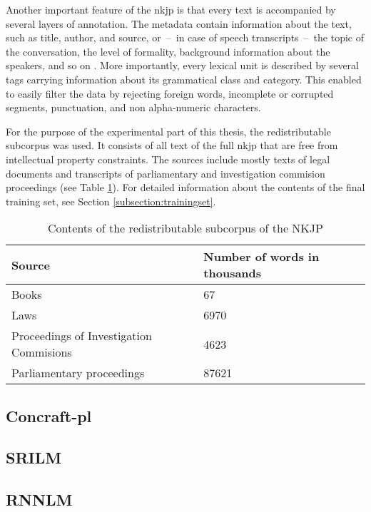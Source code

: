 Another important feature of the \gls{nkjp} is that every text is accompanied by several layers of annotation. The metadata contain information about the text, such as title, author, and source, or~--~in case of speech transcripts~--~the topic of the conversation, the level of formality, background information about the speakers, and so on \cite{przepiorkowski2009xml}. More importantly, every lexical unit is described by several tags carrying information about its grammatical class and category. This enabled to easily filter the data by rejecting foreign words, incomplete or corrupted segments, punctuation, and non alpha-numeric characters. 

For the purpose of the experimental part of this thesis, the redistributable subcorpus was used. It consists of all text of the full \gls{nkjp} that are free from intellectual property constraints. The sources include mostly texts of legal documents and transcripts of parliamentary and investigation commision proceedings (see Table \ref{table:freenkjp}). For detailed information about the contents of the final training set, see Section \ref{subsection:trainingset}.

\begin{table}[h!]
  \begin{center}
	  \caption{Contents of the redistributable subcorpus of the NKJP}
	    \label{table:freenkjp}
	    \begin{tabular*}{.8\linewidth}{@{\extracolsep{\fill}}ll}
      Source & Number of words in thousands \\
      \midrule
      Books & 67\\
      Laws & 6970\\
      Proceedings of Investigation Commisions & 4623\\
      Parliamentary proceedings & 87621\\
    \end{tabular*}
  \end{center}
\end{table}

\subsection{Concraft-pl}
\subsection{SRILM}
\subsection{RNNLM}
